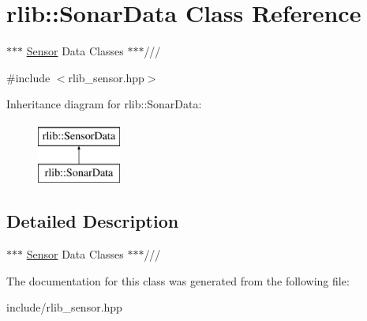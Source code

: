 \hypertarget{classrlib_1_1SonarData}{\section{rlib\-:\-:Sonar\-Data Class Reference}
\label{classrlib_1_1SonarData}
}


$\ast$$\ast$$\ast$ \hyperlink{classrlib_1_1Sensor}{Sensor} Data Classes $\ast$$\ast$$\ast$///  




{\ttfamily \#include $<$rlib\-\_\-sensor.\-hpp$>$}

Inheritance diagram for rlib\-:\-:Sonar\-Data\-:\begin{figure}[H]
\begin{center}
\leavevmode
\includegraphics[height=2.000000cm]{classrlib_1_1SonarData}
\end{center}
\end{figure}


\subsection{Detailed Description}
$\ast$$\ast$$\ast$ \hyperlink{classrlib_1_1Sensor}{Sensor} Data Classes $\ast$$\ast$$\ast$/// 

The documentation for this class was generated from the following file\-:\begin{DoxyCompactItemize}
\item 
include/rlib\-\_\-sensor.\-hpp\end{DoxyCompactItemize}
